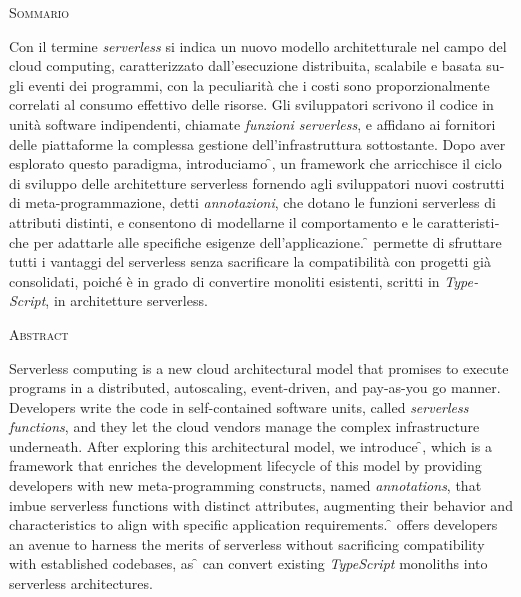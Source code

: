 \begin{center}
  \textsc{Sommario}
\end{center}
%
\noindent
%
\begin{otherlanguage}{italian}
Con il termine \textit{serverless} si indica un nuovo modello architetturale nel campo del cloud computing,
caratterizzato dall'esecuzione distribuita, scalabile e basata sugli eventi dei programmi,
con la peculiarità che i costi sono proporzionalmente correlati al consumo effettivo delle risorse.
Gli sviluppatori scrivono il codice in unità software indipendenti, chiamate \textit{funzioni serverless},
e affidano ai fornitori delle piattaforme la complessa gestione dell'infrastruttura sottostante.
Dopo aver esplorato questo paradigma, introduciamo \f{},
un framework che arricchisce il ciclo di sviluppo delle architetture serverless fornendo agli sviluppatori
nuovi costrutti di meta-programmazione, detti \textit{annotazioni},
che dotano le funzioni serverless di attributi distinti,
e consentono di modellarne il comportamento e le caratteristiche per adattarle alle specifiche esigenze dell'applicazione.
\f{} permette di sfruttare tutti i vantaggi del serverless
senza sacrificare la compatibilità con progetti già consolidati,
poiché è in grado di convertire monoliti esistenti, scritti in \textit{TypeScript}, in architetture serverless.
\end{otherlanguage}

\newpage


\begin{center}
  \textsc{Abstract}
\end{center}
%
\noindent
%
Serverless computing is a new cloud architectural model that promises
to execute programs in a distributed, autoscaling, event-driven, and pay-as-you go manner.
Developers write the code in self-contained software units, called \textit{serverless functions},
and they let the cloud vendors manage the complex infrastructure underneath.
After exploring this architectural model, we introduce \f{}, which is a framework that enriches the development
lifecycle of this model by providing developers with new
meta-programming constructs, named \textit{annotations},
that imbue serverless functions with distinct attributes,
augmenting their behavior and characteristics to align with specific application requirements.
\f{} offers developers an avenue to harness the merits of serverless
without sacrificing compatibility with established codebases, as \f{} can convert
existing \textit{TypeScript} monoliths into serverless architectures.

\newpage
\
\thispagestyle{empty}
\cleardoublepage
